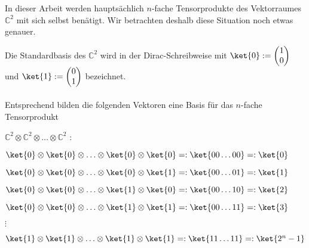 \vspace{0.3cm}
\noindent In dieser Arbeit werden hauptsächlich $n$-fache Tensorprodukte des Vektorraumes $\mathbb{C}^2$ mit sich selbst benätigt. Wir betrachten deshalb diese Situation noch etwas genauer.

\noindent Die Standardbasis des $\mathbb{C}^2$ wird in der Dirac-Schreibweise mit $\ket{0}:= \begin{pmatrix}1 \\ 0\end{pmatrix}$ und $\ket{1}:= \begin{pmatrix}0 \\ 1\end{pmatrix}$ bezeichnet.

\paragraph{}

\noindent Entsprechend bilden die folgenden Vektoren eine Basis  für das $n$-fache Tensorprodukt 

\hspace{5.5cm}$\mathbb{C}^2\otimes \mathbb{C}^2\otimes\ldots \otimes \mathbb{C}^2$ :


\vspace{0.2cm}
\hspace{3.5cm}\begin{minipage}[t]{10cm}

$\ket{0}\otimes\ket{0}\otimes\ldots\otimes\ket{0}\otimes\ket{0}=:\ket{00\ldots 00}=:\ket{0}$

\vspace{0.2cm}
$\ket{0}\otimes\ket{0}\otimes\ldots\otimes\ket{0}\otimes\ket{1}=:\ket{00\ldots 01}=:\ket{1}$

\vspace{0.2cm}
$\ket{0}\otimes\ket{0}\otimes\ldots\otimes\ket{1}\otimes\ket{0}=:\ket{00\ldots 10}=:\ket{2}$

\vspace{0.2cm}
$\ket{0}\otimes\ket{0}\otimes\ldots\otimes\ket{1}\otimes\ket{1}=:\ket{00\ldots 11}=:\ket{3}$

\vspace{0.1cm}
\hspace{4cm}$\vdots$

\vspace{0.1cm}
$\ket{1}\otimes\ket{1}\otimes\ldots\otimes\ket{1}\otimes\ket{1}=:\ket{11\ldots 11}=:\ket{2^n-1}$

\end{minipage}

